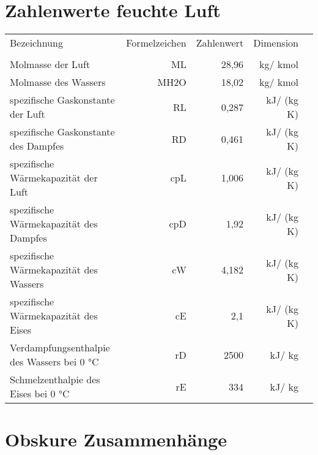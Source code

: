 \documentclass[twocolumn]{article}
\begin{document}
\section{Zahlenwerte feuchte Luft}

\begin{center}
\begin{tabular}{l|r|r|r|r}
Bezeichnung& Formelzeichen& Zahlenwert& Dimension \\
	&&&& \\
Molmasse der Luft& ML& 28,96& kg/ kmol \\
Molmasse des Wassers& MH2O& 18,02& kg/ kmol \\
spezifische Gaskonstante der Luft& RL& 0,287& kJ/ (kg K) \\
spezifische Gaskonstante des Dampfes& RD& 0,461& kJ/ (kg K) \\
spezifische Wärmekapazität der Luft& cpL& 1,006& kJ/ (kg K) \\
spezifische Wärmekapazität des Dampfes& cpD& 1,92& kJ/ (kg K) \\
spezifische Wärmekapazität des Wassers& cW& 4,182& kJ/ (kg K) \\
spezifische Wärmekapazität des Eises& cE& 2,1& kJ/ (kg K) \\
Verdampfungsenthalpie des Wassers bei 0 °C& rD& 2500& kJ/ kg \\
Schmelzenthalpie des Eises bei 0 °C& rE& 334& kJ/ kg \\
\end{tabular}


\end{center}

%                                             
%
\section{Obskure Zusammenhänge}
\end{document}
